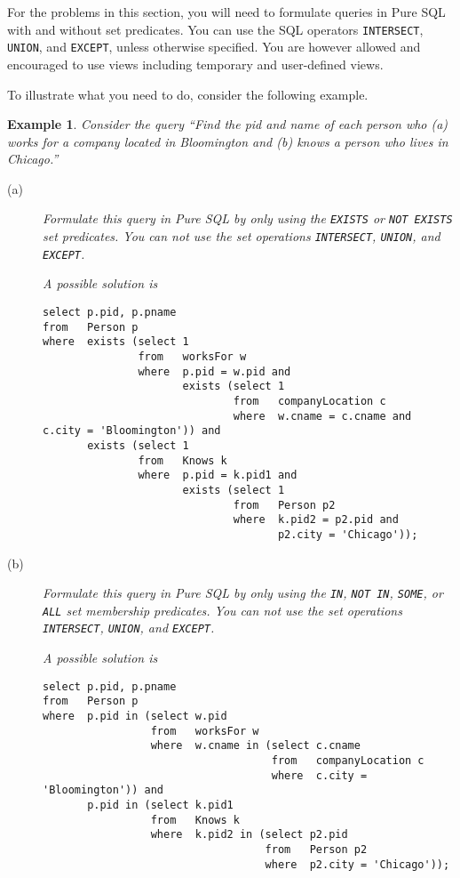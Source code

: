 \documentclass[11pt]{article}
\newtheorem{example}{Example}
\begin{document}
For the problems in this section, you will need to formulate queries in {Pure SQL} with and without set predicates.
You can use the SQL operators {\tt INTERSECT}, {\tt UNION}, and {\tt EXCEPT}, unless otherwise specified.
You are however allowed and  encouraged to use views including temporary and user-defined views.

To illustrate what you need to do, consider the following example.
\begin{example}\label{PureSQLquery}
Consider the query ``\emph{Find the pid and name of each person who (a)
works for a company located in Bloomington  and (b)
knows a person who lives in Chicago.}''

\begin{description}
\item[(a)]   Formulate this query in Pure SQL by only using the {\tt EXISTS} or {\tt NOT EXISTS} set predicates.
You can not use the set operations {\tt INTERSECT}, {\tt UNION}, and {\tt EXCEPT}.

A possible solution is
{\footnotesize
\begin{verbatim}
select p.pid, p.pname
from   Person p
where  exists (select 1
               from   worksFor w
               where  p.pid = w.pid and
                      exists (select 1
                              from   companyLocation c
                              where  w.cname = c.cname and c.city = 'Bloomington')) and
       exists (select 1
               from   Knows k
               where  p.pid = k.pid1 and
                      exists (select 1
                              from   Person p2
                              where  k.pid2 = p2.pid and
                                     p2.city = 'Chicago'));
\end{verbatim}
}

\item[(b)]   Formulate this query in Pure SQL by only using the {\tt  IN}, {\tt NOT IN}, {\tt SOME}, or {\tt ALL} set membership predicates.
You can not use the set operations {\tt INTERSECT}, {\tt UNION}, and {\tt EXCEPT}.

A possible solution is
{\footnotesize
\begin{verbatim}
select p.pid, p.pname
from   Person p
where  p.pid in (select w.pid
                 from   worksFor w
                 where  w.cname in (select c.cname
                                    from   companyLocation c
                                    where  c.city = 'Bloomington')) and
       p.pid in (select k.pid1
                 from   Knows k
                 where  k.pid2 in (select p2.pid
                                   from   Person p2
                                   where  p2.city = 'Chicago'));
\end{verbatim}
}


\end{description}
\end{example}
\end{document}
